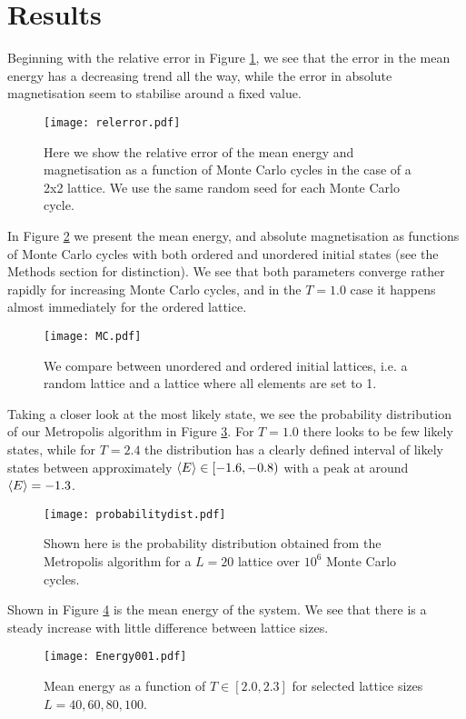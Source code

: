 \section{Results}
\label{sec:results}

Beginning with the relative error in Figure \ref{fig:compare}, we see that the error in the mean energy has a decreasing trend all the way, while the error in absolute magnetisation seem to stabilise around a fixed value.
\begin{figure}[htbp]
	\centering
	\texttt{[image: relerror.pdf]}
	\caption{Here we show the relative error of the mean energy and magnetisation as a function of Monte Carlo cycles in the case of a 2x2 lattice. We use the same random seed for each Monte Carlo cycle.}
	\label{fig:compare}
\end{figure}

In Figure \ref{fig:MC} we present the mean energy, and absolute magnetisation as functions of Monte Carlo cycles with both ordered and unordered initial states (see the Methods section for distinction). We see that both parameters converge rather rapidly for increasing Monte Carlo cycles, and in the $T=1.0$ case it happens almost immediately for the ordered lattice.
\begin{figure}[htbp]
	\centering
	\texttt{[image: MC.pdf]}
	\caption{We compare between unordered and ordered initial lattices, i.e. a random lattice and a lattice where all elements are set to 1.}
	\label{fig:MC}
\end{figure}

Taking a closer look at the most likely state, we see the probability distribution of our Metropolis algorithm in Figure \ref{fig:probabilitydist}. For $T=1.0$ there looks to be few likely states, while for $T=2.4$ the distribution has a clearly defined interval of likely states between approximately $\expval{E} \in [-1.6, -0.8)$ with a peak at around $\expval{E} = -1.3$.
\begin{figure}[htbp]
	\centering
	\texttt{[image: probabilitydist.pdf]}
	\caption{Shown here is the probability distribution obtained from the Metropolis algorithm for a $L=20$ lattice over $10^6$ Monte Carlo cycles.}
	\label{fig:probabilitydist}
\end{figure}

Shown in Figure \ref{fig:energy001} is the mean energy of the system. We see that there is a steady increase with little difference between lattice sizes.
\begin{figure}[htbp]
	\centering
	\texttt{[image: Energy001.pdf]}
	\caption{Mean energy as a function of $T \in[2.0, 2.3]$ for selected lattice sizes $L = 40, 60, 80, 100$.}
	\label{fig:energy001}
\end{figure}

